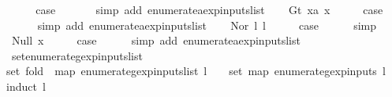 \begin{isabellebody}
\ \ \isamarkupfalse%
\ \isamarkupfalse%
\ {\isacharquery}case\ \isanewline
\ \ \ \ \isamarkupfalse%
\ {\isacharparenleft}simp\ add{\isacharcolon}\ enumerate{\isacharunderscore}aexp{\isacharunderscore}inputs{\isacharunderscore}list{\isacharparenright}\isanewline
{}\isamarkupfalse%
\isanewline
\ \ \isamarkupfalse%
\ {\isacharparenleft}Gt\ x{}a\ x{}{\isacharparenright}\isanewline
\ \ \isamarkupfalse%
\ \isamarkupfalse%
\ {\isacharquery}case\isanewline
\ \ \ \ \isamarkupfalse%
\ {\isacharparenleft}simp\ add{\isacharcolon}\ enumerate{\isacharunderscore}aexp{\isacharunderscore}inputs{\isacharunderscore}list{\isacharparenright}\isanewline
{}\isamarkupfalse%
\isanewline
\ \ \isamarkupfalse%
\ {\isacharparenleft}Nor\ l{}\ l{}{\isacharparenright}\isanewline
\ \ \isamarkupfalse%
\ \isamarkupfalse%
\ {\isacharquery}case\isanewline
\ \ \ \ \isamarkupfalse%
\ simp\isanewline
{}\isamarkupfalse%
\isanewline
\ \ \isamarkupfalse%
\ {\isacharparenleft}Null\ x{\isacharparenright}\isanewline
\ \ \isamarkupfalse%
\ \isamarkupfalse%
\ {\isacharquery}case\isanewline
\ \ \ \ \isamarkupfalse%
\ {\isacharparenleft}simp\ add{\isacharcolon}\ enumerate{\isacharunderscore}aexp{\isacharunderscore}inputs{\isacharunderscore}list{\isacharparenright}\isanewline
{}\isamarkupfalse%
%
\endisatagproof
{\isafoldproof}%
%
\isadelimproof
\isanewline
%
\endisadelimproof
\isanewline
{}\isamarkupfalse%
\ set{\isacharunderscore}enumerate{\isacharunderscore}gexp{\isacharunderscore}inputs{\isacharunderscore}list{\isacharcolon}\ \isanewline
{\isachardoublequoteopen}set\ {\isacharparenleft}fold\ {\isacharparenleft}{\isacharat}{\isacharparenright}\ {\isacharparenleft}map\ enumerate{\isacharunderscore}gexp{\isacharunderscore}inputs{\isacharunderscore}list\ l{\isacharparenright}\ {\isacharbrackleft}{\isacharbrackright}{\isacharparenright}\ {\isacharequal}\ {\isacharparenleft}{\isasymUnion}\ {\isacharparenleft}set\ {\isacharparenleft}map\ enumerate{\isacharunderscore}gexp{\isacharunderscore}inputs\ l{\isacharparenright}{\isacharparenright}{\isacharparenright}{\isachardoublequoteclose}\isanewline
%
\isadelimproof
%
\endisadelimproof
%
\isatagproof
{}\isamarkupfalse%
{\isacharparenleft}induct\ l{\isacharparenright}\isanewline
{}\isamarkupfalse%

\end{isabellebody}
